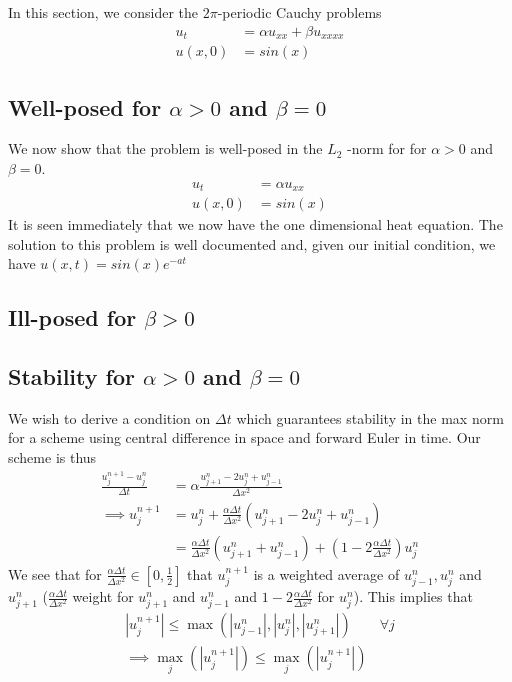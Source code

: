 In this section, we consider the $2\pi$-periodic Cauchy problems
\begin{align*}
u_t &= \alpha u_{xx} + \beta u_{xxxx} \\
u(x,0) &= sin(x)
\end{align*}


\subsection{Well-posed for $\alpha>0$ and $\beta = 0$}
We now show that the problem is well-posed in the $L_2$ -norm for for $\alpha>0$ and $\beta = 0$.
\begin{align*}
u_t &= \alpha u_{xx} \\
u(x,0) &= sin(x)
\end{align*} 
It is seen immediately that we now have the one dimensional heat equation. The solution to this problem is well documented and, given our initial condition, we have $u(x,t) = sin(x)e^{-at}$  



\subsection{Ill-posed for $\beta>0$}


\subsection{Stability for $\alpha>0$ and $\beta=0$}
We wish to derive a condition on $\Delta t$ which guarantees stability in the max norm for a scheme using central difference in space and forward Euler in time. Our scheme is thus
\begin{align*}
\frac{u_j^{n+1} - u_j^n}{\Delta t}&=\alpha \frac{u_{j+1}^n -2u_j^n+u_{j-1}^n}{\Delta x^2} \\
\implies u_j^{n+1} &= u_j^n + \frac{\alpha \Delta t}{\Delta x^2} (u_{j+1}^n -2u_j^n+u_{j-1}^n) \\
&=  \frac{\alpha \Delta t}{\Delta x^2} (u_{j+1}^n +u_{j-1}^n) + (1-2\frac{\alpha \Delta t}{\Delta x^2})u_j^n 
\end{align*}
We see that for $\frac{\alpha \Delta t}{\Delta x^2} \in [0,\frac{1}{2}]$ that $u_j^{n+1}$ is a weighted average of $u_{j-1}^n,u_j^n$ and $u_{j+1}^n$ ($\frac{\alpha \Delta t}{\Delta x^2}$ weight for $u_{j+1}^n$ and $u_{j-1}^n$ and $1-2\frac{\alpha \Delta t}{\Delta x^2}$ for $u_j^n$).
This implies that
\begin{align}
|u_j^{n+1}| \leq \max(|u_{j-1}^n|,|u_j^n|,|u_{j+1}^n|) \qquad \forall j \label{maxeq} \\
\implies \max_j (|u_j^{n+1}|) \leq \max_j (|u_j^{n+1}|) \nonumber
\end{align}


